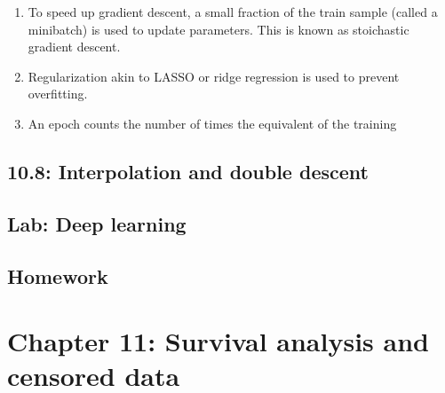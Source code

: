 \documentclass{article}
\begin{document}
\begin{enumerate}
\begin{enumerate}
\[\]
Denote everything inside $g$ as $z_{ik}$, then
\[
\frac{\partial R_i(\theta)}{\partial \beta_k} = \frac{\partial R_i(\theta)}{\partial f_{\theta} (x_i)}\frac{\partial f_{\theta} (x_i)}{\partial \beta_k} = -(y_i-f_{\theta}(x_i))g(z_{ik})
\]
and also
\[
\frac{\partial R_i(\theta)}{\partial w_{kj}} 
= \frac{\partial R_i(\theta)}{\partial f_{\theta} (x_i)}\frac{\partial f_{\theta} (x_i)}{\partial g(z_{ik})} \frac{\partial g(z_{ik})}{\partial z_{ik}} \frac{\partial z_{ik}}{\partial w_{kj}} 
= -(y_i-f_{\theta}(x_i))\beta_k g'(z_{ik}) x_{ij}
\]
Note that a fraction of the residuals ($y_i - f_{\theta}(x_i)$) are assigned to the parameters via the chain rule. This is the heart of backward propagation.
\end{enumerate}

\item To speed up gradient descent, a small fraction of the train sample (called a minibatch) is used to update parameters. This is known as stoichastic gradient descent. 

\item Regularization akin to LASSO or ridge regression is used to prevent overfitting. 

\item An epoch counts the number of times the equivalent of the training 
\end{enumerate}

\subsection*{10.8: Interpolation and double descent}

\subsection*{Lab: Deep learning}

\subsection*{Homework}

\section*{Chapter 11: Survival analysis and censored data} 
\end{document}
